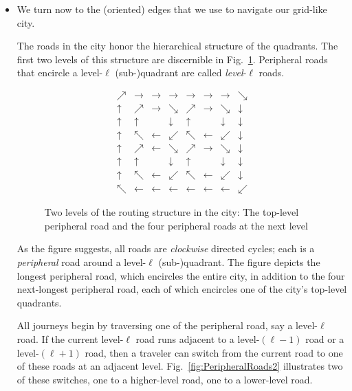 \begin{enumerate}
{\begin{itemize}
\medskip\item
We turn now to the (oriented) edges that we use to navigate our grid-like city.

\smallskip

The roads in the city honor the hierarchical structure of the quadrants.  The first two levels of this structure are discernible in Fig.~\ref{fig:PeripheralRoads}.  Peripheral roads that encircle a level-$\ell$ (sub-)quadrant are called {\em level}-$\ell$ roads.
\begin{figure}
\[
\begin{array}{c|ccc|ccc|c}
\nearrow & \rightarrow & \rightarrow & \rightarrow & \rightarrow & \rightarrow & \rightarrow & \searrow \\
\hline
\uparrow & \nearrow & \rightarrow & \searrow     & \nearrow  & \rightarrow & \searrow         & \downarrow \\
\uparrow & \uparrow &                   & \downarrow & \uparrow &                    & \downarrow    & \downarrow \\
\uparrow & \nwarrow & \leftarrow    & \swarrow    & \nwarrow & \leftarrow    & \swarrow       & \downarrow \\
\hline
\uparrow & \nearrow & \leftarrow    & \searrow     & \nearrow  & \rightarrow  & \searrow      & \downarrow \\
\uparrow & \uparrow &                    & \downarrow & \uparrow &                    & \downarrow  & \downarrow \\
\uparrow & \nwarrow & \leftarrow    & \swarrow     & \nwarrow & \leftarrow     & \swarrow    & \downarrow \\
\hline
\nwarrow & \leftarrow & \leftarrow & \leftarrow & \leftarrow & \leftarrow & \leftarrow                     & \swarrow
\end{array}
\]
\caption{Two levels of the routing structure in the city: The top-level peripheral road and the four peripheral roads at the next level}
\label{fig:PeripheralRoads}
\end{figure}
As the figure suggests, all roads are {\em clockwise} directed cycles; each is a {\em peripheral} road around a level-$\ell$ (sub-)quadrant.  The figure depicts the longest peripheral road, which encircles the entire city, in addition to the four next-longest peripheral road, each of which encircles one of the city's top-level quadrants.

\medskip

All journeys begin by traversing one of the peripheral road, say a level-$\ell$ road.  If the current level-$\ell$ road runs adjacent to a level-$(\ell -1)$ road or a level-$(\ell +1)$ road, then a traveler can switch from the current road to one of these roads at an adjacent level.  Fig.~\ref{fig:PeripheralRoads2} illustrates two of these switches, one to a higher-level road, one to a lower-level road.


\end{itemize}}
\end{enumerate}
